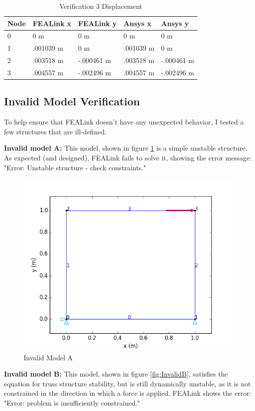 \documentclass[11pt, oneside]{article}   	%
\begin{document}
\begin{table}[h]
\centering
 \caption{Verification 3 Displacement}
 \label{table:V3}
 \begin{tabular}{l|l|l|l|l}
 Node & FEALink x & FEALink y  & Ansys x   & Ansys y    \\ \hline
 0    & 0 m       & 0 m        & 0 m       & 0 m        \\
 1    & .001039 m & 0 m        & .001039 m & 0 m        \\
 2    & .003518 m & -.000461 m & .003518 m & -.000461 m \\
 3    & .004557 m & -.002496 m & .004557 m & -.002496 m   
 \end{tabular}
\end{table}

\subsection{Invalid Model Verification}
To help ensure that FEALink doesn't have any unexpected behavior, I tested a few structures that are ill-defined.

\textbf{Invalid model A:} This model, shown in figure \ref{fig:InvalidA} is a simple unstable structure.  As expected (and designed), FEALink fails to solve it, showing the error message: "Error: Unstable structure - check constraints."

\begin{figure}[!h]
\centering
 \includegraphics[width=.5\textwidth]{Verification/FEALink/InvalidA.png}
 \caption{Invalid Model A}
 \label{fig:InvalidA}
\end{figure}

\textbf{Invalid model B:} This model, shown in figure \ref{fig:InvalidB}, satisfies the equation for truss structure stability, but is still dynamically unstable, as it is not constrained in the direction in which a force is applied.  FEALink shows the error: "Error: problem is insufficiently constrained."
\end{document}
